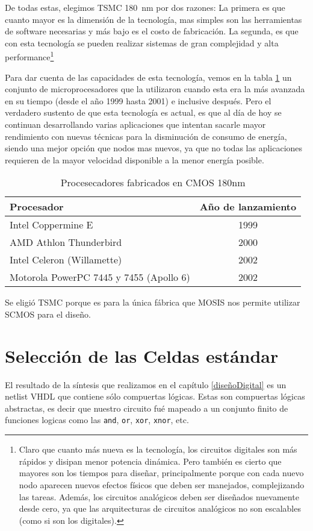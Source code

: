 De todas estas, elegimos TSMC 180~nm por dos razones: La primera es que cuanto mayor es la dimensión de la tecnología, mas simples son las herramientas de software necesarias y más bajo es el costo de fabricación. La segunda, es que con esta tecnología se pueden realizar sistemas de gran complejidad y alta performance\footnote{Claro que cuanto más nueva es la tecnología, los circuitos digitales son más rápidos y disipan menor potencia dinámica. Pero también es cierto que mayores son los tiempos para diseñar, principalmente porque con cada nuevo nodo aparecen nuevos efectos físicos que deben ser manejados, complejizando las tareas. Además, los circuitos analógicos deben ser diseñados nuevamente desde cero, ya que las arquitecturas de circuitos analógicos no son escalables (como si son los digitales).
}

Para dar cuenta de las capacidades de esta tecnología, vemos en la tabla \ref{cuadro:procesadores180nm} un conjunto de microprocesadores que la utilizaron cuando esta era la más avanzada en su tiempo (desde el año 1999 hasta 2001) e inclusive después. Pero el verdadero sustento de que esta tecnología es actual, es que al día de hoy se continuan desarrollando varias aplicaciones que intentan sacarle mayor rendimiento con nuevas técnicas para la disminución de consumo de energía, siendo una mejor opción que nodos mas nuevos, ya que no todas las aplicaciones requieren de la mayor velocidad disponible a la menor energía posible. 

\begin{table}[h]
\centering
\begin{tabular}{@{}lc@{}}
\toprule
Procesador             & Año de lanzamiento \\ \midrule
Intel Coppermine E                & 1999             \\
AMD Athlon Thunderbird      & 2000             \\
Intel Celeron (Willamette)               & 2002            \\
Motorola PowerPC 7445 y 7455 (Apollo 6) & 2002           \\ \bottomrule
\end{tabular}
\caption{Procesecadores fabricados en CMOS 180nm }
\label{cuadro:procesadores180nm}
\end{table}

Se eligió TSMC porque es para la única fábrica que MOSIS nos permite utilizar SCMOS para el diseño.




\section{Selección de las Celdas estándar}\label{celdasEstandars}
El resultado de la síntesis que realizamos en el capítulo \ref{diseñoDigital} es un netlist VHDL que contiene sólo compuertas lógicas. Estas son compuertas lógicas abstractas, es decir que nuestro circuito fué mapeado a un conjunto finito de funciones logicas como las \verb.and., \verb.or., \verb.xor., \verb.xnor., etc.

